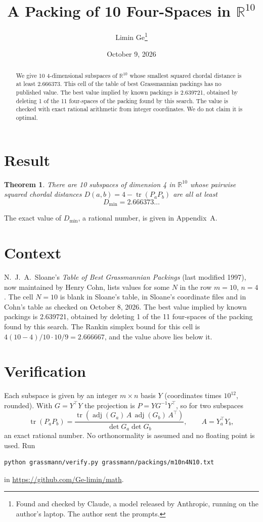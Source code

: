 \documentclass[11pt,a4paper]{article}
\title{A Packing of 10 Four-Spaces in $\mathbb{R}^{10}$}
\author{Limin Ge\thanks{Found and checked by Claude, a model released by Anthropic, running on the author's laptop. The author sent the prompts.}}
\date{October 9, 2026}
\newtheorem*{theorem}{Theorem}
\begin{document}
\maketitle
\begin{abstract}
We give 10 4-dimensional subspaces of $\mathbb{R}^{10}$ whose smallest squared chordal distance is at least 2.666373. This cell of the table of best Grassmannian packings has no published value. The best value implied by known packings is 2.639721, obtained by deleting 1 of the 11 four-spaces of the packing found by this search. The value is checked with exact rational arithmetic from integer coordinates. We do not claim it is optimal.
\end{abstract}

\section{Result}
\begin{theorem}
There are 10 subspaces of dimension 4 in $\mathbb{R}^{10}$ whose pairwise squared chordal distances $D(a,b) = 4 - \operatorname{tr}(P_aP_b)$ are all at least
\[ D_{\min} = 2.666373\ldots \]
\end{theorem}
The exact value of $D_{\min}$, a rational number, is given in Appendix~A.


\section{Context}
N.~J.~A.~Sloane's \emph{Table of Best Grassmannian Packings} (last modified 1997), now maintained by Henry Cohn, lists values for some $N$ in the row $m=10$, $n=4$. The cell $N=10$ is blank in Sloane's table, in Sloane's coordinate files and in Cohn's table as checked on October 8, 2026. The best value implied by known packings is 2.639721, obtained by deleting 1 of the 11 four-spaces of the packing found by this search. The Rankin simplex bound for this cell is $4(10-4)/10\cdot 10/9 = 2.666667$, and the value above lies below it.


\section{Verification}
Each subspace is given by an integer $m\times n$ basis $Y$ (coordinates times $10^{12}$, rounded). With $G=Y^\top Y$ the projection is $P=YG^{-1}Y^\top$, so for two subspaces
\[ \operatorname{tr}(P_aP_b)=\frac{\operatorname{tr}(\operatorname{adj}(G_a)\,A\,\operatorname{adj}(G_b)\,A^\top)}{\det G_a\det G_b},\qquad A=Y_a^\top Y_b, \]
an exact rational number. No orthonormality is assumed and no floating point is used. Run
\begin{verbatim}
python grassmann/verify.py grassmann/packings/m10n4N10.txt
\end{verbatim}
in \url{https://github.com/Ge-limin/math}.
\end{document}
